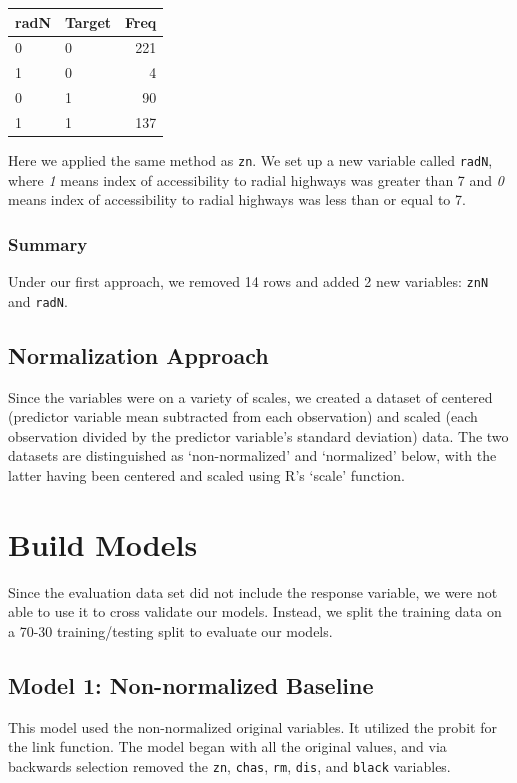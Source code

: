 \documentclass[]{article}
\begin{document}
\begin{longtable}[c]{@{}llr@{}}
\toprule
radN & Target & Freq\tabularnewline
\midrule
\endhead
0 & 0 & 221\tabularnewline
1 & 0 & 4\tabularnewline
0 & 1 & 90\tabularnewline
1 & 1 & 137\tabularnewline
\bottomrule
\end{longtable}

Here we applied the same method as \texttt{zn}. We set up a new variable
called \texttt{radN}, where \emph{1} means index of accessibility to
radial highways was greater than 7 and \emph{0} means index of
accessibility to radial highways was less than or equal to 7.

\subsubsection{Summary}\label{summary}

Under our first approach, we removed 14 rows and added 2 new variables:
\texttt{znN} and \texttt{radN}.

\subsection{Normalization Approach}\label{normalization-approach}

Since the variables were on a variety of scales, we created a dataset of
centered (predictor variable mean subtracted from each observation) and
scaled (each observation divided by the predictor variable's standard
deviation) data. The two datasets are distinguished as `non-normalized'
and `normalized' below, with the latter having been centered and scaled
using R's `scale' function.

\section{Build Models}\label{build-models}

Since the evaluation data set did not include the response variable, we
were not able to use it to cross validate our models. Instead, we split
the training data on a 70-30 training/testing split to evaluate our
models.

\subsection{Model 1: Non-normalized
Baseline}\label{model-1-non-normalized-baseline}

This model used the non-normalized original variables. It utilized the
probit for the link function. The model began with all the original
values, and via backwards selection removed the \texttt{zn},
\texttt{chas}, \texttt{rm}, \texttt{dis}, and \texttt{black} variables.
\end{document}
